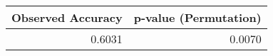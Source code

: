 \begin{tabular}{rr}
\toprule
Observed Accuracy & p-value (Permutation) \\
\midrule
0.6031 & 0.0070 \\
\bottomrule
\end{tabular}

